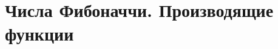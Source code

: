 \documentclass[discrete.tex]{subfiles}
\begin{document}
  \section{Числа Фибоначчи. Производящие функции}
\end{document}
